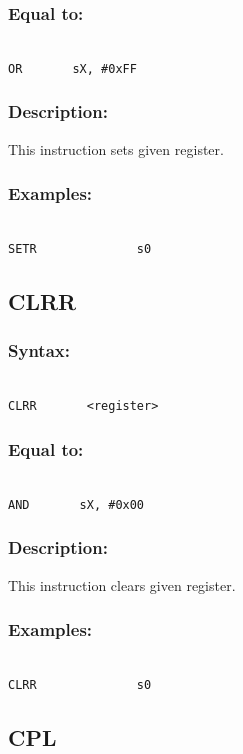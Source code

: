         \subsubsection{Equal to:}
        {
            ~\\
            \usecodefont
            \verb'OR       sX, #0xFF'
        }
        \subsubsection{Description:}
            This instruction sets given register.

        \subsubsection{Examples:}
        {
            ~\\
            \usecodefont
            \verb'SETR              s0'\\
        }

    \subsection{CLRR}
        \subsubsection{Syntax:}
        {
            ~\\
            \usecodefont
            \verb'CLRR       <register>'
        }
        \subsubsection{Equal to:}
        {
            ~\\
            \usecodefont
            \verb'AND       sX, #0x00'
        }
        \subsubsection{Description:}
            This instruction clears given register.

        \subsubsection{Examples:}
        {
            ~\\
            \usecodefont
            \verb'CLRR              s0'\\
        }

    \subsection{CPL}
